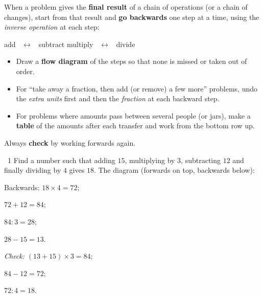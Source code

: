 \begin{knowbox}
When a problem gives the \textbf{final result} of a chain of operations (or a chain of changes), start from that result and \textbf{go backwards} one step at a time, using the \emph{inverse operation} at each step:
\begin{center}
add \ $\longleftrightarrow$ \ subtract \qquad\qquad multiply \ $\longleftrightarrow$ \ divide
\end{center}
\begin{itemize}[leftmargin=1.4em,itemsep=3pt]
\item Draw a \textbf{flow diagram} of the steps so that none is missed or taken out of order.
\item For ``take away a fraction, then add (or remove) a few more'' problems, undo the \emph{extra units} first and then the \emph{fraction} at each backward step.
\item For problems where amounts pass between several people (or jars), make a \textbf{table} of the amounts after each transfer and work from the bottom row up.
\end{itemize}
Always \textbf{check} by working forwards again.
\end{knowbox}
\gap
\begin{exbox}{\ExWord\ 1}
Find a number such that adding $15$, multiplying by $3$, subtracting $12$ and finally dividing by $4$ gives $18$.
\guide
The diagram (forwards on top, backwards below):
\begin{center}
\end{center}
Backwards: $18\times4=72$;\par $72+12=84$;\par $84:3=28$;\par $28-15=13$.\par
\emph{Check:} $(13+15)\times3=84$;\par $84-12=72$;\par $72:4=18$.
\end{exbox}
